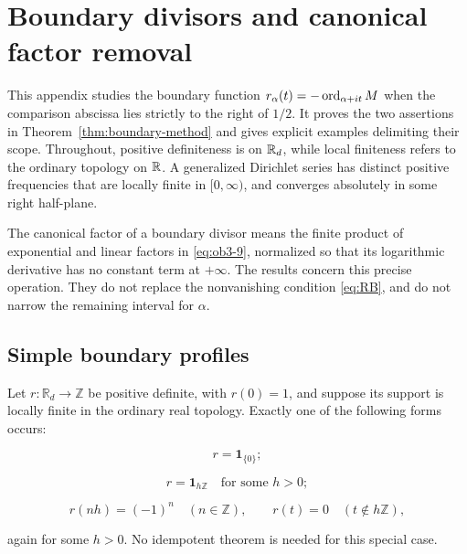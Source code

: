 \section{Boundary divisors and canonical factor removal}\label{sec:offcentral-obstructions}

This appendix studies the boundary function \(r_\alpha(t)=-\operatorname{ord}_{\alpha+it}M\) when the comparison abscissa lies strictly to the right of \(1/2\). It proves the two assertions in Theorem~\ref{thm:boundary-method} and gives explicit examples delimiting their scope. Throughout, positive definiteness is on \(\mathbb R_d\), while local finiteness refers to the ordinary topology on \(\mathbb R\). A generalized Dirichlet series has distinct positive frequencies that are locally finite in \([0,\infty)\), and converges absolutely in some right half-plane.

The canonical factor of a boundary divisor means the finite product of exponential and linear factors in \eqref{eq:ob3-9}, normalized so that its logarithmic derivative has no constant term at \(+\infty\). The results concern this precise operation. They do not replace the nonvanishing condition \eqref{eq:RB}, and do not narrow the remaining interval for \(\alpha\).

\subsection{Simple boundary profiles}

\begin{proposition}\label{prop:ob-simple}

Let \(r:\mathbb R_d\to\mathbb Z\) be positive definite, with \(r(0)=1\), and suppose its support is locally finite in the ordinary real topology. Exactly one of the following forms occurs:

\begin{equation}\label{eq:ob2-1}
r=\mathbf1_{\{0\}};
\end{equation}

\begin{equation}\label{eq:ob2-2}
r=\mathbf1_{h\mathbb Z}\quad\text{for some }h>0;
\end{equation}

\begin{equation}\label{eq:ob2-3}
r(nh)=(-1)^n\quad(n\in\mathbb Z),\qquad
r(t)=0\quad(t\notin h\mathbb Z),
\end{equation}

again for some \(h>0\). No idempotent theorem is needed for this special case.

\end{proposition}

